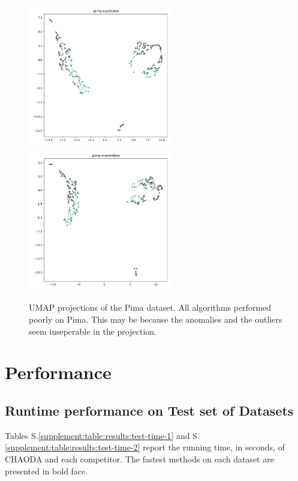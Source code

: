 \documentclass{article}
\begin{document}
\begin{figure}
   \centering
   \includegraphics[width=2.5in]{images/umaps/pima-euclidean-umap2d.png}
   \includegraphics[width=2.5in]{images/umaps/pima-manhattan-umap2d.png}
   \caption{UMAP projections of the Pima dataset.
   All algorithms performed poorly on Pima.
   This may be because the anomalies and the outliers seem inseperable in the projection.}
   \label{supplement:fig:conclusions:umap-embeddings-2}
\end{figure}


\section{Performance}
\label{supplement:sec:performance}

\subsection{Runtime performance on Test set of Datasets}

Tables S.\ref{supplement:table:results:test-time-1} and S.\ref{supplement:table:results:test-time-2} report the running time, in seconds, of CHAODA and each competitor.
The fastest methods on each dataset are presented in bold face.
\end{document}

